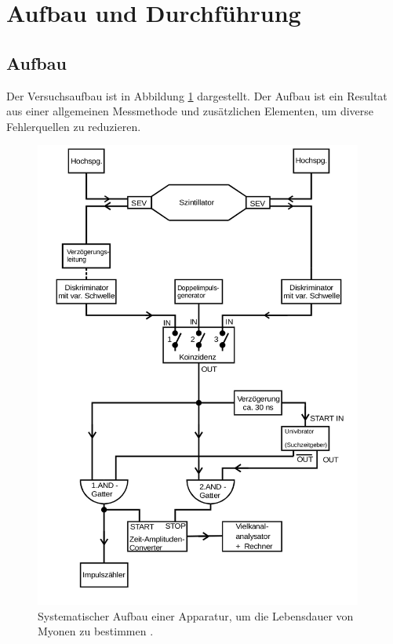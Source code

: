 \section{Aufbau und Durchführung}
\subsection{Aufbau}
\label{sec:Aufbau}

Der Versuchsaufbau ist in Abbildung \ref{fig:aufbau1} dargestellt.
Der Aufbau ist ein Resultat aus einer allgemeinen Messmethode und zusätzlichen Elementen, um diverse Fehlerquellen zu reduzieren.\\

\begin{figure}
  \centering
  \includegraphics[height=15.5cm]{ressources/aufbau.jpeg}
  \caption{Systematischer Aufbau einer Apparatur, um die Lebensdauer von Myonen zu bestimmen \cite{skript}.}
  \label{fig:aufbau1}
\end{figure}



